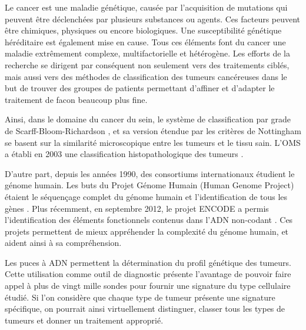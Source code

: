 		Le cancer est une maladie génétique, causée par l'acquisition de mutations qui peuvent être déclenchées par plusieurs substances ou agents.
		Ces facteurs peuvent être chimiques, physiques ou encore biologiques.
		Une susceptibilité génétique héréditaire est également mise en cause.
		Tous ces éléments font du cancer une maladie extrêmement complexe, multifactorielle et hétérogène.
		Les efforts de la recherche se dirigent par conséquent non seulement vers des traitements ciblés, mais aussi vers des méthodes de classification des tumeurs cancéreuses dans le but de trouver des groupes de patients permettant d'affiner et d'adapter le traitement de facon beaucoup plus fine.

		Ainsi, dans le domaine du cancer du sein, le système de classification par grade de Scarff-Bloom-Richardson \citep{Bloom1957}, et sa version étendue par les critères de Nottingham \citep{Elston1991} se basent sur la similarité microscopique entre les tumeurs et le tissu sain.
		L'\ac{OMS} a établi en 2003 une classification histopathologique des tumeurs \citep{WHO2003}.

		D'autre part, depuis les années 1990, des consortiums internationaux étudient le génome humain.
		Les buts du Projet Génome Humain (Human Genome Project) étaient le séquençage complet du génome humain et l'identification de tous les gènes \citep{HGP2001}.
		Plus récemment, en septembre 2012, le projet \ac{ENCODE} a permis l'identification des éléments fonctionnels contenus dans l'\acs{ADN} non-codant \citep{ENCODE2012}.
		Ces projets permettent de mieux appréhender la complexité du génome humain, et aident ainsi à sa compréhension.

		Les puces à \acs{ADN} permettent la détermination du profil génétique des tumeurs.
		Cette utilisation comme outil de diagnostic présente l'avantage de pouvoir faire appel à plus de vingt mille sondes pour fournir une signature du type cellulaire étudié.
		Si l'on considère que chaque type de tumeur présente une signature spécifique, on pourrait ainsi virtuellement distinguer, classer tous les types de tumeurs et donner un traitement approprié.

